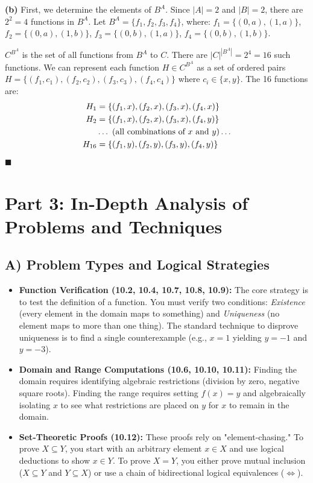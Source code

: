 \documentclass[11pt, a4paper]{article}
\theoremstyle{definition}
\theoremstyle{remark}
\begin{document}
\textbf{(b)} First, we determine the elements of $B^A$. Since $|A|=2$ and $|B|=2$, there are $2^2 = 4$ functions in $B^A$. Let $B^A = \{f_1, f_2, f_3, f_4\}$, where:
$f_1 = \{(0, a), (1, a)\}$, $f_2 = \{(0, a), (1, b)\}$, $f_3 = \{(0, b), (1, a)\}$, $f_4 = \{(0, b), (1, b)\}$.

$C^{B^A}$ is the set of all functions from $B^A$ to $C$. There are $|C|^{|B^A|} = 2^4 = 16$ such functions. We can represent each function $H \in C^{B^A}$ as a set of ordered pairs $H = \{(f_1, c_1), (f_2, c_2), (f_3, c_3), (f_4, c_4)\}$ where $c_i \in \{x, y\}$. The 16 functions are:
\begin{align*}
    H_1 &= \{(f_1, x), (f_2, x), (f_3, x), (f_4, x)\} \\ \relax
    H_2 &= \{(f_1, x), (f_2, x), (f_3, x), (f_4, y)\} \\ \relax
    &\dots \text{ (all combinations of } x \text{ and } y \text{)} \dots \\ \relax
    H_{16} &= \{(f_1, y), (f_2, y), (f_3, y), (f_4, y)\}
\end{align*}
$\blacksquare$

\newpage
\section{Part 3: In-Depth Analysis of Problems and Techniques}

\subsection{A) Problem Types and Logical Strategies}
\begin{itemize}
    \item \textbf{Function Verification (10.2, 10.4, 10.7, 10.8, 10.9):} The core strategy is to test the definition of a function. You must verify two conditions: \textit{Existence} (every element in the domain maps to something) and \textit{Uniqueness} (no element maps to more than one thing). The standard technique to disprove uniqueness is to find a single counterexample (e.g., $x=1$ yielding $y=-1$ and $y=-3$).
    \item \textbf{Domain and Range Computations (10.6, 10.10, 10.11):} Finding the domain requires identifying algebraic restrictions (division by zero, negative square roots). Finding the range requires setting $f(x) = y$ and algebraically isolating $x$ to see what restrictions are placed on $y$ for $x$ to remain in the domain.
    \item \textbf{Set-Theoretic Proofs (10.12):} These proofs rely on "element-chasing." To prove $X \subseteq Y$, you start with an arbitrary element $x \in X$ and use logical deductions to show $x \in Y$. To prove $X = Y$, you either prove mutual inclusion ($X \subseteq Y$ and $Y \subseteq X$) or use a chain of bidirectional logical equivalences ($\iff$).
\end{itemize}
\end{document}
